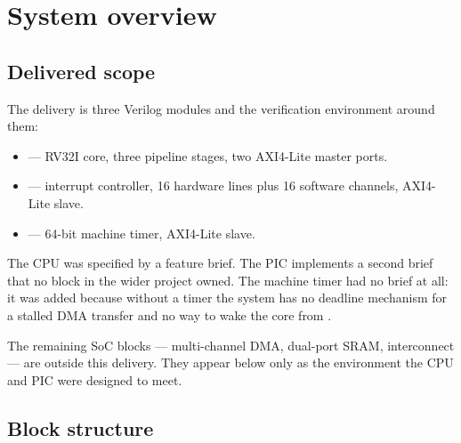 \chapter{System overview}
\label{ch:soc}

\section{Delivered scope}

The delivery is three Verilog modules and the verification environment around
them:

\begin{itemize}[nosep]
  \item {} --- RV32I core, three pipeline stages, two AXI4-Lite
        master ports.
  \item {} --- interrupt controller, 16 hardware lines plus 16
        software channels, AXI4-Lite slave.
  \item {} --- 64-bit machine timer, AXI4-Lite slave.
\end{itemize}

The CPU was specified by a feature brief. The PIC implements a second brief that
no block in the wider project owned. The machine timer had no brief at all: it
was added because without a timer the system has no deadline mechanism for a
stalled DMA transfer and no way to wake the core from .

The remaining SoC blocks --- multi-channel DMA, dual-port SRAM, interconnect ---
are outside this delivery. They appear below only as the environment the CPU and
PIC were designed to meet.

\section{Block structure}

